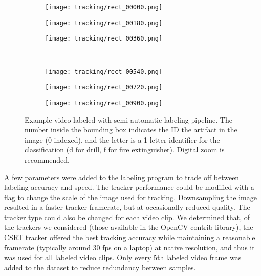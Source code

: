 \begin{figure}
	\centering
	\begin{subfigure}{0.32\textwidth}
		\texttt{[image: tracking/rect\_00000.png]}
	\end{subfigure}		
	\hfill
	\begin{subfigure}{0.32\textwidth}
		\texttt{[image: tracking/rect\_00180.png]}
	\end{subfigure}
	\hfill
	\begin{subfigure}{0.32\textwidth}
		\texttt{[image: tracking/rect\_00360.png]}
	\end{subfigure}
	\\
	\begin{subfigure}{0.32\textwidth}
		\texttt{[image: tracking/rect\_00540.png]}
	\end{subfigure}		
	\hfill
	\begin{subfigure}{0.32\textwidth}
		\texttt{[image: tracking/rect\_00720.png]}
	\end{subfigure}
	\hfill
	\begin{subfigure}{0.32\textwidth}
		\texttt{[image: tracking/rect\_00900.png]}
	\end{subfigure}	
	\caption[Example video labeled with semi-automatic pipeline]{Example video labeled with semi-automatic labeling pipeline. The number inside the bounding box indicates the ID the artifact in the image (0-indexed), and the letter is a 1 letter identifier for the classification (d for drill, f for fire extinguisher). Digital zoom is recommended.}
	\label{semi_automatic_labeling}
\end{figure}

A few parameters were added to the labeling program to trade off between labeling accuracy and speed. The tracker performance could be modified with a flag to change the scale of the image used for tracking. Downsampling the image resulted in a faster tracker framerate, but at occasionally reduced quality. The tracker type could also be changed for each video clip. We determined that, of the trackers we considered (those available in the OpenCV contrib library), the CSRT tracker offered the best tracking accuracy while maintaining a reasonable framerate (typically around 30 fps on a laptop) at native resolution, and thus it was used for all labeled video clips. Only every 5th labeled video frame was added to the dataset to reduce redundancy between samples.

